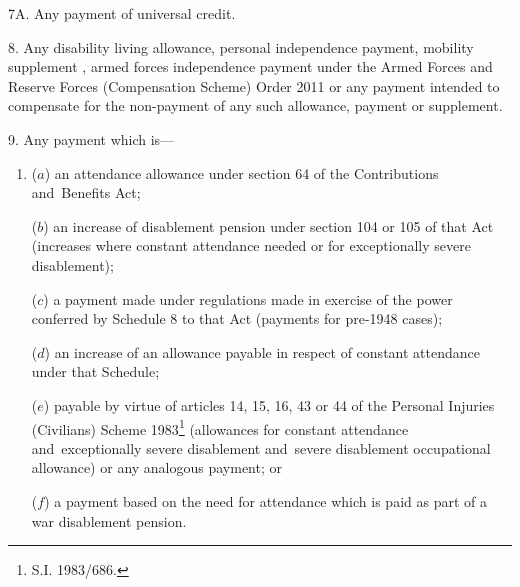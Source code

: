\documentclass[12pt,a4paper]{article}
\begin{document}

\medskip

7A.  Any payment of universal credit.


\medskip


8.  Any disability living allowance, personal independence payment, mobility supplement%
, armed forces independence payment under the Armed Forces and Reserve Forces (Compensation Scheme) Order 2011  %
or any payment intended to compensate for the non-payment of any such allowance, payment or supplement.


\medskip

9.  Any payment which is—
\begin{enumerate}\item[]
($a$) an attendance allowance under section 64 of the Contributions and~Benefits Act;

($b$) an increase of disablement pension under section 104 or 105 of that Act (increases where constant attendance needed or for exceptionally severe disablement);

($c$) a payment made under regulations made in exercise of the power conferred by Schedule 8 to that Act (payments for pre-1948 cases);

($d$) an increase of an allowance payable in respect of constant attendance under that Schedule;

($e$) payable by virtue of articles 14, 15, 16, 43 or 44 of the Personal Injuries (Civilians) Scheme 1983\footnote{\frenchspacing S.I. 1983/686.} (allowances for constant attendance and~exceptionally severe disablement and~severe disablement occupational allowance) or any analogous payment; or

($f$) a payment based on the need for attendance which is paid as part of a war disablement pension.
\end{enumerate}
\end{document}

